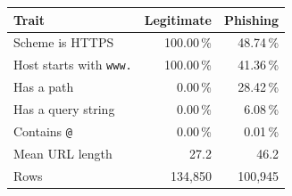 \begin{tabular}{lrr}
\toprule
Trait & Legitimate & Phishing \\
\midrule
Scheme is HTTPS & 100.00\,\% & 48.74\,\% \\
Host starts with \texttt{www.} & 100.00\,\% & 41.36\,\% \\
Has a path & 0.00\,\% & 28.42\,\% \\
Has a query string & 0.00\,\% & 6.08\,\% \\
Contains \texttt{@} & 0.00\,\% & 0.01\,\% \\
Mean URL length & 27.2 & 46.2 \\
\midrule
Rows & 134{,}850 & 100{,}945 \\
\bottomrule
\end{tabular}
